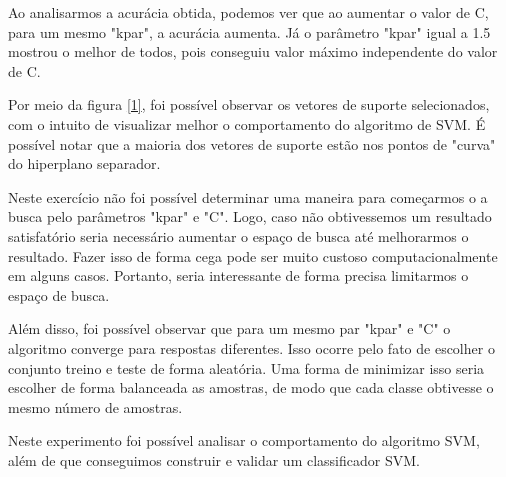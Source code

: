 \documentclass[12pt]{article}
\begin{document}
  \par Ao analisarmos a acurácia obtida, podemos ver que ao aumentar o valor de C, para um mesmo "kpar", a acurácia aumenta. Já o parâmetro "kpar" igual a 1.5 mostrou o melhor de todos, pois conseguiu valor máximo independente do valor de C.  
  \par Por meio da figura \ref{1}, foi possível observar os vetores de suporte selecionados, com o intuito de visualizar melhor o comportamento do algoritmo de SVM. É possível notar que a maioria dos vetores de suporte estão nos pontos de "curva" do hiperplano separador.
  \par Neste exercício não foi possível determinar uma maneira para começarmos o a busca pelo parâmetros "kpar" e "C". Logo, caso não obtivessemos um resultado satisfatório seria necessário aumentar o espaço de busca até melhorarmos o resultado. Fazer isso de forma cega pode ser muito custoso computacionalmente em alguns casos. Portanto, seria interessante de forma precisa limitarmos o espaço de busca.
  \par Além disso, foi possível observar que para um mesmo par "kpar" e "C" o algoritmo converge para respostas diferentes. Isso ocorre pelo fato de escolher o conjunto treino e teste de forma aleatória. Uma forma de minimizar isso seria escolher de forma balanceada as amostras, de modo que cada classe obtivesse o mesmo número de amostras.  
   \par Neste experimento foi possível analisar o comportamento do algoritmo SVM, além de que conseguimos construir e validar um classificador SVM.

\end{document}
